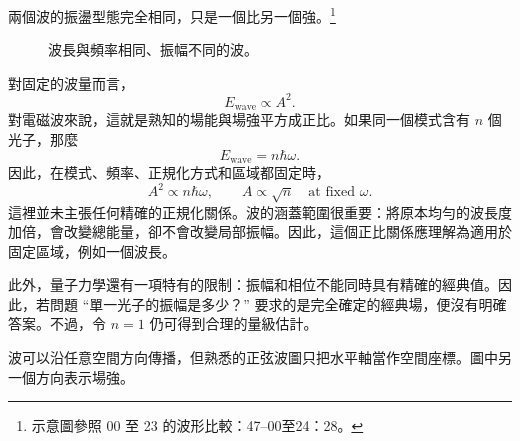 兩個波的振盪型態完全相同，只是一個比另一個強。\footnote{示意圖參照 00 至 23 的波形比較：47--00至24：28。}

\begin{figure}[t]
\centering
{}
\caption{波長與頻率相同、振幅不同的波。}
\end{figure}

對固定的波量而言，
\begin{equation}
E_{\text{wave}}\propto A^2.
\end{equation}
對電磁波來說，這就是熟知的場能與場強平方成正比。如果同一個模式含有 \(n\) 個光子，那麼
\begin{equation}
E_{\text{wave}}=n\hbar\omega.
\end{equation}
因此，在模式、頻率、正規化方式和區域都固定時，
\begin{equation}
A^2\propto n\hbar\omega,
\qquad
A\propto\sqrt n\quad\text{at fixed }\omega.
\end{equation}
這裡並未主張任何精確的正規化關係。波的涵蓋範圍很重要：將原本均勻的波長度加倍，會改變總能量，卻不會改變局部振幅。因此，這個正比關係應理解為適用於固定區域，例如一個波長。

此外，量子力學還有一項特有的限制：振幅和相位不能同時具有精確的經典值。因此，若問題 ``單一光子的振幅是多少？'' 要求的是完全確定的經典場，便沒有明確答案。不過，令 \(n=1\) 仍可得到合理的量級估計。

\begin{classroomqa}
\end{classroomqa}

波可以沿任意空間方向傳播，但熟悉的正弦波圖只把水平軸當作空間座標。圖中另一個方向表示場強。

\begin{classroomqa}
\end{classroomqa}

